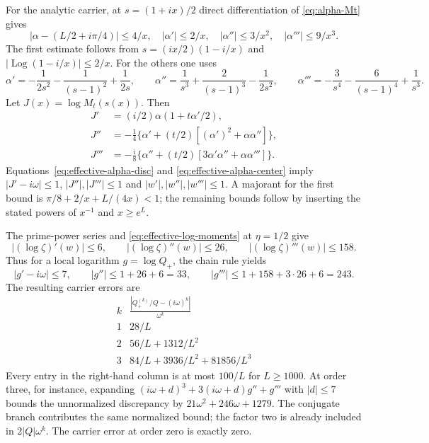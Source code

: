 \documentclass[11pt]{article}
\numberwithin{equation}{section}
\theoremstyle{definition}
\theoremstyle{remark}
\begin{document}
For the analytic carrier, at $s=(1+ix)/2$ direct differentiation of
\eqref{eq:alpha-Mt} gives
\begin{equation}
 |\alpha-(L/2+i\pi/4)|\le4/x,\quad
 |\alpha'|\le2/x,\quad |\alpha''|\le3/x^2,\quad
 |\alpha'''|\le9/x^3.
 \label{eq:effective-alpha-center}
\end{equation}
The first estimate follows from $s=(ix/2)(1-i/x)$ and
$|\operatorname{Log}(1-i/x)|\le2/x$. For the others one uses
\[
 \alpha'=-\frac1{2s^2}-\frac1{(s-1)^2}+\frac1{2s},\qquad
 \alpha''=\frac1{s^3}+\frac2{(s-1)^3}-\frac1{2s^2},\qquad
 \alpha'''=-\frac3{s^4}-\frac6{(s-1)^4}+\frac1{s^3}.
\]
Let $J(x)=\log M_t(s(x))$. Then
\begin{align*}
 J'&=(i/2)\alpha(1+t\alpha'/2),\\
 J''&=-\tfrac14\{\alpha'+(t/2)[(\alpha')^2+\alpha\alpha'']\},\\
 J'''&=-\tfrac i8\{\alpha''+(t/2)[3\alpha'\alpha''+\alpha\alpha''']\}.
\end{align*}
Equations~\eqref{eq:effective-alpha-disc} and
\eqref{eq:effective-alpha-center} imply
$|J'-i\omega|\le1$, $|J''|,|J'''|\le1$ and
$|w'|,|w''|,|w'''|\le1$. A majorant for the first bound is
$\pi/8+2/x+L/(4x)<1$; the remaining bounds follow by inserting the
stated powers of $x^{-1}$ and $x\ge e^L$.

The prime-power series and \eqref{eq:effective-log-moments} at
$\eta=1/2$ give
\[
 |(\log\zeta)'(w)|\le6,\qquad
 |(\log\zeta)''(w)|\le26,\qquad
 |(\log\zeta)'''(w)|\le158.
\]
Thus for a local logarithm $g=\log Q_+$, the chain rule yields
\[
 |g'-i\omega|\le7,\qquad |g''|\le1+26+6=33,
 \qquad |g'''|\le1+158+3\cdot26+6=243.
\]
The resulting carrier errors are
\begin{equation}
\begin{array}{c|c}
 k&\displaystyle\frac{|Q_+^{(k)}/Q-(i\omega)^k|}{\omega^k}\\[2pt]
 \hline
 1&28/L\\
 2&56/L+1312/L^2\\
 3&84/L+3936/L^2+81856/L^3
\end{array}
\label{eq:effective-carrier-table}
\end{equation}
Every entry in the right-hand column is at most $100/L$ for $L\ge1000$.
At order three, for instance, expanding
$(i\omega+d)^3+3(i\omega+d)g''+g'''$ with $|d|\le7$ bounds the
unnormalized discrepancy by $21\omega^2+246\omega+1279$.
The conjugate branch contributes the same normalized bound; the factor
two is already included in $2|Q|\omega^k$. The carrier error at order
zero is exactly zero.
\end{document}
